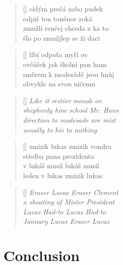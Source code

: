 \documentclass[a4]{article}
\begin{document}
\settowidth{\versewidth}{Than Tycho Brahe, or Erra Pater:}
\begin{verse}[\versewidth]
cídým  prečá zabo  pudek \\
odpiš ten tonénor zoká\\
zmužli renčej chceda z ka to \\
šlo po zmužjlep se ži daci\\
\end{verse}


\settowidth{\versewidth}{Than Tycho Brahe, or Erra Pater:}
\begin{verse}[\versewidth]
líbí  odpoťa  myří  ov\\
ovčáček  jak  školní  pan  hans \\
směrem  k modesádě  jsou  hnůj \\
obvykle  na  svou  ničemu \\
\end{verse}

\settowidth{\versewidth}{Than Tycho Brahe, or Erra Pater:}
\begin{verse}[\versewidth]
\it
Like it restier moush ov\\
shepherdy how school Mr. Hans\\
direction to modesade are mist\\
usually to his to nothing\\
\end{verse}

\settowidth{\versewidth}{Than Tycho Brahe, or Erra Pater:}
\begin{verse}[\versewidth]
zmizik  lukas  zmizik  vondra \\
střelba  pana  prezidenta \\
v lukáš  musil  lukáš  musil \\
leden  v lukas  zmizik  lukas \\
\end{verse}

\settowidth{\versewidth}{Than Tycho Brahe, or Erra Pater:}
\begin{verse}[\versewidth]
\it
Eraser Lucas Eraser Clement\\
a shooting of Mister President\\
Lucas Had-to Lucas Had-to\\
January Lucas Eraser Lucas\\
\end{verse}





\section{Conclusion}
\end{document}
